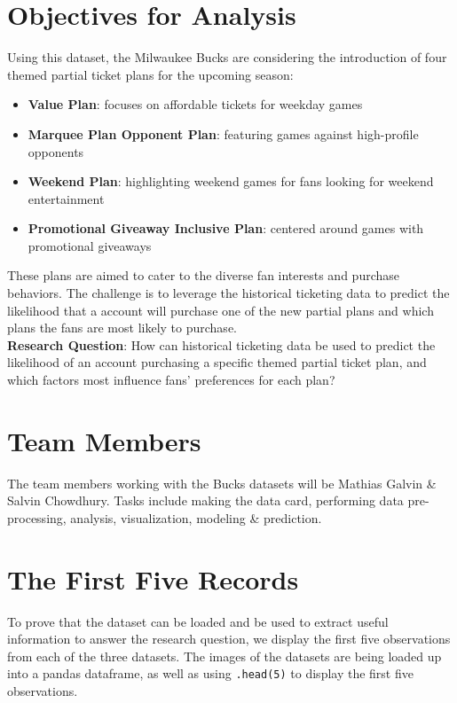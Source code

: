 \documentclass[a4paper]{article}
\begin{document}
\section{Objectives for Analysis}
Using this dataset, the Milwaukee Bucks are considering the introduction of four themed partial ticket plans for the
upcoming season:
\begin{itemize}
    \setlength{\itemsep}{0.2em} 
    \item \textbf{Value Plan}: focuses on affordable tickets for weekday games
    \item \textbf{Marquee Plan Opponent Plan}: featuring games against high-profile opponents
    \item \textbf{Weekend Plan}: highlighting weekend games for fans looking for weekend entertainment
    \item \textbf{Promotional Giveaway Inclusive Plan}: centered around games with promotional giveaways 
\end{itemize}

\noindent These plans are aimed to cater to the diverse fan interests and purchase behaviors. The challenge is to 
leverage the historical ticketing data to predict the likelihood that a account will purchase one of the new partial
plans and which plans the fans are most likely to purchase. \\

\noindent \textbf{Research Question}: How can historical ticketing data be used to predict the likelihood of an account 
purchasing a specific themed partial ticket plan, and which factors most influence fans' preferences for each plan?

\section{Team Members}
The team members working with the Bucks datasets will be Mathias Galvin \& Salvin Chowdhury. Tasks include making the 
data card, performing data pre-processing, analysis, visualization, modeling \& prediction. 

\newpage

\section{The First Five Records}
To prove that the dataset can be loaded and be used to extract useful information to answer the research question, we
display the first five observations from each of the three datasets. The images of the datasets are being loaded up 
into a pandas dataframe, as well as using \texttt{.head(5)} to display the first five observations.
\end{document}
